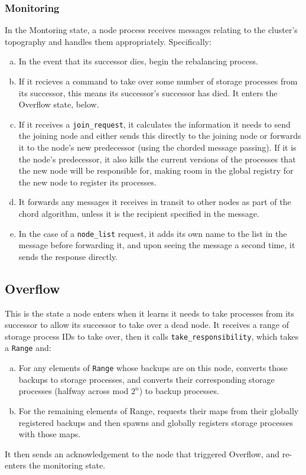 \documentclass[a4paper]{article}
\begin{document}
\subsubsection{Monitoring}
In the Montoring state, a node process receives messages relating to the cluster's topography and handles them appropriately. Specifically:
\begin{enumerate}[a.]
\item In the event that its successor dies, begin the rebalancing process.
\item If it recieves a command to take over some number of storage processes from its successor, this means its successor's successor has died. It enters the Overflow state, below.
\item If it receives a {\tt join\_request}, it calculates the information it needs to send the joining node and either sends this directly to the joining node or forwards it to the node's new predecessor (using the chorded message passing). If it is the node's predecessor, it also kills the current versions of the processes that the new node will be responsible for, making room in the global registry for the new node to register its processes.
\item It forwards any messages it receives in transit to other nodes as part of the chord algorithm, unless it is the recipient specified in the message.
\item In the case of a {\tt node\_list} request, it adds its own name to the list in the message before forwarding it, and upon seeing the message a second time, it sends the response directly.
\end{enumerate}

\subsection{Overflow}
This is the state a node enters when it learns it needs to take processes from its successor to allow its successor to take over a dead node. It receives a range of storage process IDs to take over, then it calls {\tt take\_responsibility}, which takes a {\tt Range} and:
\begin{enumerate}[a.]
\item For any elements of {\tt Range} whose backups are on this node, converts those backups to storage processes, and converts their corresponding storage processes (halfway across mod $2^n$) to backup processes.
\item For the remaining elements of Range, requests their maps from their globally registered backups and then spawns and globally registers storage processes with those maps.
\end{enumerate}
It then sends an acknowledgement to the node that triggered Overflow, and re-enters the monitoring state.
\end{document}
